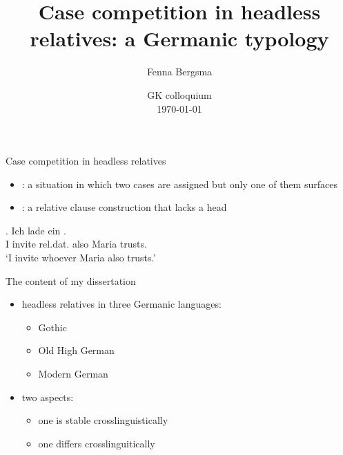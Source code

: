 \documentclass[12pt]{beamer}
\title{Case competition in headless relatives: a Germanic typology}
\author{Fenna Bergsma}
\institute{\normalsize Goethe-Universität Frankfurt}
\date{GK colloquium\\ \today}
\newcommand*{\mybox}[1]{\framebox{#1}} %
\begin{document}
\begin{frame}
\titlepage

\end{frame}

\begin{frame}{Case competition in headless relatives}

  \pause

\begin{itemize}
  \item {}: a situation in which two cases are assigned but only one of them surfaces \pause
  \item {}: a relative clause construction that lacks a head \pause
\end{itemize}

\vspace{1em}

\exg. Ich {lade ein} \mybox{\tbf{wem}}   . \\
 I invite\scsub{[acc]} \ac{rel}.\ac{dat}. also Maria trusts\scsub{[dat]}.\\
 `I invite whoever Maria also trusts.' \label{ex:mg-acc-dat-intro}

\end{frame}

%

\begin{frame}{The content of my dissertation}

\pause

\begin{itemize}
  \item headless relatives in three Germanic languages:
  \begin{itemize}
    \item Gothic
    \item Old High German
    \item Modern German
  \end{itemize}\pause
  \item two aspects:
  \begin{itemize}
    \item one is stable crosslinguistically
    \item one differs crosslinguitically
  \end{itemize}
\end{itemize}

\end{frame}
\end{document}
